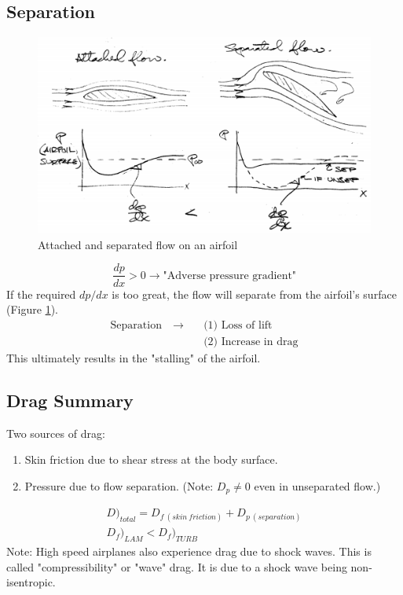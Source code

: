\documentclass[draft=false, titlepage]{article}
\begin{document}
\subsection{Separation}
\begin{figure}[ht]
	\centering
	\includegraphics[width=0.9\linewidth]{Figures/p54_separationOnAirfoil.PNG}
	\caption{Attached and separated flow on an airfoil}
	\label{fig:p54_separationOnAirfoil}
\end{figure}

\begin{equation*}
\frac{dp}{dx} > 0 \rightarrow \text{"Adverse pressure gradient"}
\end{equation*}
If the required $dp/dx$ is too great, the flow will separate from the airfoil's surface (Figure \ref{fig:p54_separationOnAirfoil}).
\begin{align*}
	\text{Separation} \quad \rightarrow &\quad \text{(1) Loss of lift}\\
	&\quad \text{(2) Increase in drag}
\end{align*}
This ultimately results in the "stalling" of the airfoil.

\subsection{Drag Summary}
Two sources of drag:
\begin{enumerate}
	\item Skin friction due to shear stress at the body surface.
	\item Pressure due to flow separation. (Note: $D_p \neq 0$ even in unseparated flow.)
\end{enumerate}
\begin{gather*}
D\Big)_{total} = D_{f\ (skin\ friction)} + D_{p\ (separation)}\\
D_f\Big)_{LAM} < D_f\Big)_{TURB}
\end{gather*}
Note: High speed airplanes also experience drag due to shock waves. This is called "compressibility" or "wave" drag. It is due to a shock wave being non-isentropic.
\end{document}
